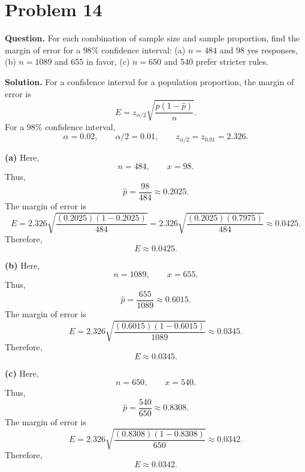 \documentclass[11pt]{article}
\begin{document}
\section*{Problem 14}

\textbf{Question.} For each combination of sample size and sample proportion, find the margin of error for a $98\%$ confidence interval: (a) $n=484$ and 98 yes responses, (b) $n=1089$ and 655 in favor, (c) $n=650$ and 540 prefer stricter rules.

\textbf{Solution.} For a confidence interval for a population proportion, the margin of error is
\[
E=z_{\alpha/2}\sqrt{\frac{\hat p(1-\hat p)}{n}}.
\]
For a $98\%$ confidence interval,
\[
\alpha=0.02, \qquad \alpha/2=0.01, \qquad z_{\alpha/2}=z_{0.01}=2.326.
\]

\textbf{(a)} Here,
\[
n=484, \qquad x=98.
\]
Thus,
\[
\hat p=\frac{98}{484}\approx 0.2025.
\]
The margin of error is
\[
E=2.326\sqrt{\frac{(0.2025)(1-0.2025)}{484}}
=2.326\sqrt{\frac{(0.2025)(0.7975)}{484}}
\approx 0.0425.
\]
Therefore,
\[
\boxed{E\approx 0.0425}.
\]

\textbf{(b)} Here,
\[
n=1089, \qquad x=655.
\]
Thus,
\[
\hat p=\frac{655}{1089}\approx 0.6015.
\]
The margin of error is
\[
E=2.326\sqrt{\frac{(0.6015)(1-0.6015)}{1089}}
\approx 0.0345.
\]
Therefore,
\[
\boxed{E\approx 0.0345}.
\]

\textbf{(c)} Here,
\[
n=650, \qquad x=540.
\]
Thus,
\[
\hat p=\frac{540}{650}\approx 0.8308.
\]
The margin of error is
\[
E=2.326\sqrt{\frac{(0.8308)(1-0.8308)}{650}}
\approx 0.0342.
\]
Therefore,
\[
\boxed{E\approx 0.0342}.
\]

\newpage
\end{document}
